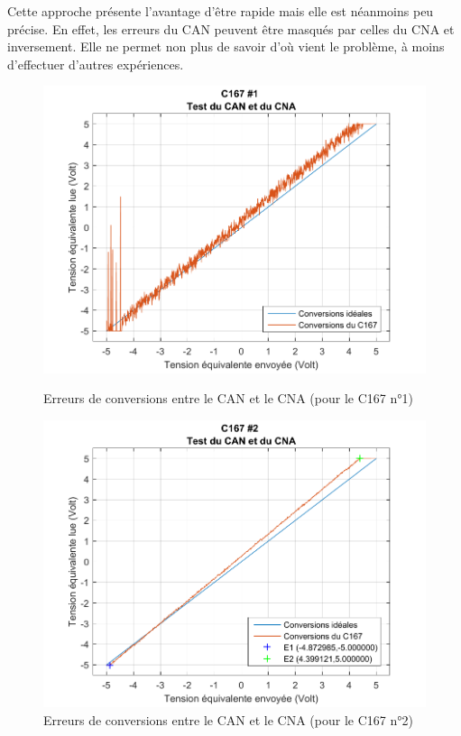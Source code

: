 Cette approche présente l'avantage d'être rapide mais elle est néanmoins peu précise. En effet, les erreurs du CAN peuvent être masqués par celles du CNA et inversement. Elle ne permet non plus de savoir d'où vient le problème, à moins d'effectuer d'autres expériences. 
\begin{figure}[!ht]
\begin{minipage}[t]{.48\textwidth}

\centering 		
\includegraphics[width=.9\textwidth]{./V/images/CAN_CNA_mesures_1.pdf}
\caption{\label{fig:errCAN_1}Erreurs de conversions entre le CAN et le CNA (pour le C167 n°1)}
\end{minipage}\hfill%
\begin{minipage}[t]{.48\textwidth}
\centering 		
\includegraphics[width=.9\textwidth]{./V/images/CAN_CNA_mesures.pdf}
\caption{\label{fig:errCAN}Erreurs de conversions entre le CAN et le CNA (pour le C167 n°2)}
\end{minipage}
\end{figure}

